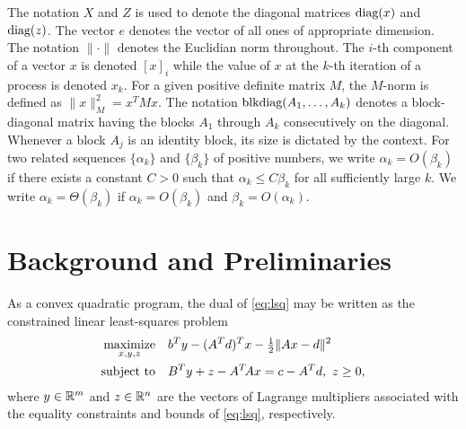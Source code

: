 \documentclass{amsart}
\begin{document}
The notation $X$ and $Z$ is used to denote the diagonal matrices $\mathop{\text{diag}}(x)$ and
$\mathop{\text{diag}}(z)$. The vector $e$ denotes the vector of all ones of appropriate
dimension. The notation $\|\cdot\|$ denotes the Euclidian norm throughout. The
$i$-th component of a vector $x$ is denoted $[x]_i$ while the value of $x$
at the $k$-th iteration of a process is denoted $x_k$. For a given
positive definite matrix $M$, the $M$-norm is defined as $\|x\|_M^2 = x^T M x$.
The notation $\mathop{\text{blkdiag}}(A_1, \ldots, A_k)$ denotes a block-diagonal matrix
having the blocks $A_1$ through $A_k$ consecutively on the diagonal. Whenever
a block $A_j$ is an identity block, its size is dictated by the context. For
two related sequences $\{\alpha_k\}$ and $\{\beta_k\}$ of positive numbers, we
write $\alpha_k = O(\beta_k)$ if there exists a constant $C > 0$ such that
$\alpha_k \leq C \beta_k$ for all sufficiently large $k$. We write $\alpha_k =
\Theta(\beta_k)$ if $\alpha_k = O(\beta_k)$ and $\beta_k = O(\alpha_k)$.

\section{Background and Preliminaries}

As a convex quadratic program, the dual of \eqref{eq:lsq} may be written as the
constrained linear least-squares problem
\begin{equation}
  \label{eq:lsq-dual}
  \begin{aligned}
    \displaystyle\mathop{\textup{maximize}}_{x,y,z} \quad &
      b^T y - (A^T d)^T x - \tfrac{1}{2} \|Ax - d\|^2 \\
    \mathop{\textup{subject to}} \quad & B^T y + z - A^T \! A x = c - A^T d, \ z \geq 0,
  \end{aligned}
\end{equation}
where $y \in \mathbb{R}^m$ and $z \in \mathbb{R}^n$ are the vectors of Lagrange multipliers
associated with the equality constraints and bounds of \eqref{eq:lsq},
respectively.
\end{document}

